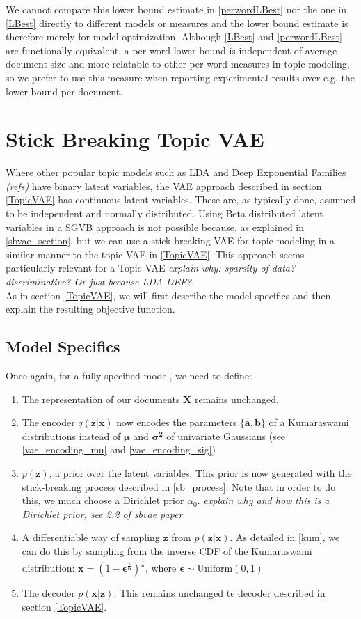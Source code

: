 \documentclass{report}
\begin{document}
We cannot compare this lower bound estimate in \ref{perwordLBest} nor the one in \ref{LBest} directly to different models or measures and the lower bound estimate is therefore merely for model optimization. Although \ref{LBest} and \ref{perwordLBest} are functionally equivalent, a per-word lower bound is independent of average document size and more relatable to other per-word measures in topic modeling, so we prefer to use this measure when reporting experimental results over e.g. the lower bound per document.



\section{Stick Breaking Topic VAE}
Where other popular topic models such as LDA and Deep Exponential Families \textit{(refs)} have binary latent variables, the VAE approach described in section \ref{TopicVAE} has continuous latent variables. These are, as typically done, assumed to be independent and normally distributed. Using Beta distributed latent variables in a SGVB approach is not possible because, as explained in \ref{sbvae_section}, but we can use a stick-breaking VAE for topic modeling in a similar manner to the topic VAE in \ref{TopicVAE}. This approach seems particularly relevant for a Topic VAE \textit{explain why: sparsity of data? discriminative? Or just because LDA DEF?}. \\
As in section \ref{TopicVAE}, we will first describe the model specifics and then explain the resulting objective function.
\subsection{Model Specifics}
Once again, for a fully specified model, we need to define:
\begin{enumerate}
	\item The representation of our documents $\mathbf{X}$ remains unchanged.
	\item The encoder $q(\mathbf{z}|\mathbf{x})$ now encodes the parameters $\{\mathbf{a}, \mathbf{b}\}$ of a Kumaraswami distributions instead of $\boldsymbol{\mu}$ and $\boldsymbol{\sigma^2}$ of univariate Gaussians (see \ref{vae_encoding_mu} and \ref{vae_encoding_sig})
	\item $p(\mathbf{z})$, a prior  over the latent variables. This prior is now generated with the stick-breaking process described in \ref{sb_process}. Note that in order to do this, we much choose a Dirichlet prior $\alpha_0$. \textit{explain why and how this is a Dirichlet prior, see 2.2 of sbvae paper}
	\item A differentiable way of sampling $\mathbf{z}$ from $p(\mathbf{z}|\mathbf{x})$. As detailed in \ref{kum}, we can do this by sampling from the inverse CDF of the Kumaraswami distribution: $\mathbf{x} = (1-\boldsymbol{\epsilon}^{\frac{1}{\mathbf{b}}})^{\frac{1}{\mathbf{a}}}$, where $\boldsymbol{\epsilon} \sim \text{Uniform}(0,1)$
	\item The decoder $p(\mathbf{x}|\mathbf{z})$. This remains unchanged te decoder described in section \ref{TopicVAE}.
\end{enumerate}
\end{document}

